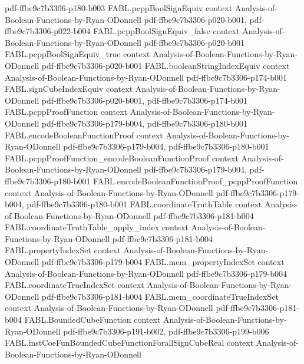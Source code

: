 \begin{theorem}
  {pdf-ffbe9c7b3306-p180-b003}
\proofstep
  {FABL.pcppBoolSignEquiv}
  {context}
  {Analysis-of-Boolean-Functions-by-Ryan-ODonnell}
  {pdf-ffbe9c7b3306-p020-b001,
    pdf-ffbe9c7b3306-p022-b004}
\proofstep
  {FABL.pcppBoolSignEquiv_false}
  {context}
  {Analysis-of-Boolean-Functions-by-Ryan-ODonnell}
  {pdf-ffbe9c7b3306-p020-b001}
\proofstep
  {FABL.pcppBoolSignEquiv_true}
  {context}
  {Analysis-of-Boolean-Functions-by-Ryan-ODonnell}
  {pdf-ffbe9c7b3306-p020-b001}
\proofstep
  {FABL.booleanStringIndexEquiv}
  {context}
  {Analysis-of-Boolean-Functions-by-Ryan-ODonnell}
  {pdf-ffbe9c7b3306-p174-b001}
\proofstep
  {FABL.signCubeIndexEquiv}
  {context}
  {Analysis-of-Boolean-Functions-by-Ryan-ODonnell}
  {pdf-ffbe9c7b3306-p020-b001,
    pdf-ffbe9c7b3306-p174-b001}
\proofstep
  {FABL.pcppProofFunction}
  {context}
  {Analysis-of-Boolean-Functions-by-Ryan-ODonnell}
  {pdf-ffbe9c7b3306-p179-b004,
    pdf-ffbe9c7b3306-p180-b001}
\proofstep
  {FABL.encodeBooleanFunctionProof}
  {context}
  {Analysis-of-Boolean-Functions-by-Ryan-ODonnell}
  {pdf-ffbe9c7b3306-p179-b004,
    pdf-ffbe9c7b3306-p180-b001}
\proofstep
  {FABL.pcppProofFunction_encodeBooleanFunctionProof}
  {context}
  {Analysis-of-Boolean-Functions-by-Ryan-ODonnell}
  {pdf-ffbe9c7b3306-p179-b004,
    pdf-ffbe9c7b3306-p180-b001}
\proofstep
  {FABL.encodeBooleanFunctionProof_pcppProofFunction}
  {context}
  {Analysis-of-Boolean-Functions-by-Ryan-ODonnell}
  {pdf-ffbe9c7b3306-p179-b004,
    pdf-ffbe9c7b3306-p180-b001}
\proofstep
  {FABL.coordinateTruthTable}
  {context}
  {Analysis-of-Boolean-Functions-by-Ryan-ODonnell}
  {pdf-ffbe9c7b3306-p181-b004}
\proofstep
  {FABL.coordinateTruthTable_apply_index}
  {context}
  {Analysis-of-Boolean-Functions-by-Ryan-ODonnell}
  {pdf-ffbe9c7b3306-p181-b004}
\proofstep
  {FABL.propertyIndexSet}
  {context}
  {Analysis-of-Boolean-Functions-by-Ryan-ODonnell}
  {pdf-ffbe9c7b3306-p179-b004}
\proofstep
  {FABL.mem_propertyIndexSet}
  {context}
  {Analysis-of-Boolean-Functions-by-Ryan-ODonnell}
  {pdf-ffbe9c7b3306-p179-b004}
\proofstep
  {FABL.coordinateTrueIndexSet}
  {context}
  {Analysis-of-Boolean-Functions-by-Ryan-ODonnell}
  {pdf-ffbe9c7b3306-p181-b004}
\proofstep
  {FABL.mem_coordinateTrueIndexSet}
  {context}
  {Analysis-of-Boolean-Functions-by-Ryan-ODonnell}
  {pdf-ffbe9c7b3306-p181-b004}
\proofstep
  {FABL.BoundedCubeFunction}
  {context}
  {Analysis-of-Boolean-Functions-by-Ryan-ODonnell}
  {pdf-ffbe9c7b3306-p191-b002,
    pdf-ffbe9c7b3306-p199-b006}
\proofstep
  {FABL.instCoeFunBoundedCubeFunctionForallSignCubeReal}
  {context}
  {Analysis-of-Boolean-Functions-by-Ryan-ODonnell}

\end{theorem}
